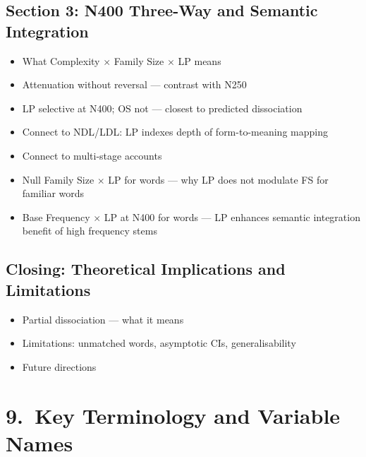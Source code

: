 \documentclass[11pt, a4paper]{article}
\begin{document}
\subsection{Section 3: N400 Three-Way and Semantic Integration}
\begin{itemize}[leftmargin=1.5em]
  \item What Complexity $\times$ Family Size $\times$ LP means
  \item Attenuation without reversal — contrast with N250
  \item LP selective at N400; OS not — closest to predicted dissociation
  \item Connect to NDL/LDL: LP indexes depth of form-to-meaning mapping
  \item Connect to multi-stage accounts
  \item Null Family Size $\times$ LP for words — why LP does not modulate FS for familiar words
  \item Base Frequency $\times$ LP at N400 for words — LP enhances semantic integration benefit of high frequency stems
\end{itemize}

\subsection{Closing: Theoretical Implications and Limitations}
\begin{itemize}[leftmargin=1.5em]
  \item Partial dissociation — what it means
  \item Limitations: unmatched words, asymptotic CIs, generalisability
  \item Future directions
\end{itemize}

\section{9.\ Key Terminology and Variable Names}
\end{document}
